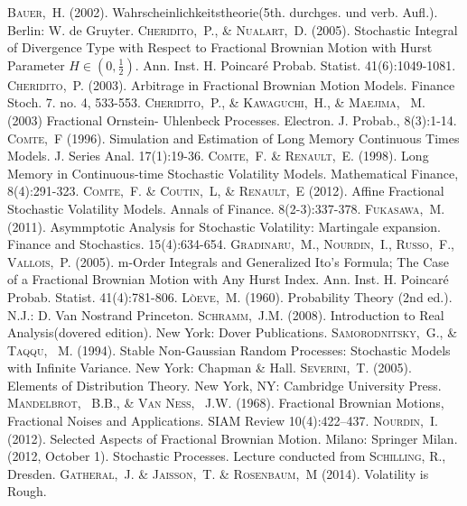 \documentclass[a4paper, twoside, 11pt]{article}
\theoremstyle{definition}
\begin{document}
\fancyhead[LO, RE]{}
\begin{thebibliography}{99}
	 \textsc{Bauer,~H.} (2002). Wahrscheinlichkeitstheorie(5th. durchges. und verb. Aufl.). Berlin: W. de Gruyter.
	 \textsc{Cheridito,~P., \& Nualart,~D.} (2005). Stochastic Integral of Divergence Type with Respect to Fractional Brownian Motion with Hurst Parameter $H \in(0, \frac{1}{2})$. Ann. Inst. H. Poincar\'e Probab. Statist. 41(6):1049-1081. 
	 \textsc{Cheridito,~P.} (2003). Arbitrage in Fractional Brownian Motion Models. Finance Stoch. 7. no. 4, 533-553.
	 \textsc{Cheridito,~P., \& Kawaguchi,~H., \& Maejima, ~M.} (2003) Fractional Ornstein- Uhlenbeck Processes. Electron. J. Probab., 8(3):1-14.
	 \textsc{Comte,~F} (1996). Simulation and Estimation of Long Memory Continuous Times Models. J. Series Anal. 17(1):19-36.
	 \textsc{Comte,~F. \& Renault,~E.} (1998). Long Memory in Continuous-time Stochastic Volatility Models. Mathematical Finance, 8(4):291-323.
	   \textsc{Comte,~F. \& Coutin,~L, \& Renault,~E} (2012). Affine Fractional Stochastic Volatility Models. Annals of Finance. 8(2-3):337-378.
	   \textsc{Fukasawa,~M.} (2011). Asymmptotic Analysis for Stochastic Volatility: Martingale expansion. Finance and Stochastics. 15(4):634-654.
	 \textsc{Gradinaru,~M., Nourdin,~I., Russo,~F., Vallois,~P.} (2005). m-Order Integrals and Generalized Ito's Formula; The Case of a Fractional Brownian Motion with Any Hurst Index. Ann. Inst. H. Poincar\'e Probab. Statist. 41(4):781-806. 
	 \textsc{L\`oeve,~M.} (1960). Probability Theory (2nd ed.). N.J.: D. Van Nostrand Princeton.
	 \textsc{Schramm,~J.M.} (2008). Introduction to Real Analysis(dovered edition). New York: Dover Publications.
	 \textsc{Samorodnitsky,~G., \& Taqqu, ~M.} (1994). Stable Non-Gaussian Random Processes: Stochastic Models with Infinite Variance. New York: Chapman \& Hall.
	\textsc{Severini,~T.} (2005). Elements of Distribution Theory. New York, NY: Cambridge University Press.
	 \textsc{Mandelbrot, ~B.B., \& Van Ness, ~J.W.} (1968). Fractional Brownian Motions, Fractional Noises and Applications. SIAM Review 10(4):422–437.
	 \textsc{Nourdin,~I.} (2012). Selected Aspects of Fractional Brownian Motion. Milano: Springer Milan.
	 (2012, October 1). Stochastic Processes. Lecture conducted from \textsc{Schilling, R.}, Dresden.
	 \textsc{Gatheral,~J. \& Jaisson,~T. \& Rosenbaum,~M} (2014). Volatility is Rough.
\end{thebibliography}
\newpage
\end{document}
